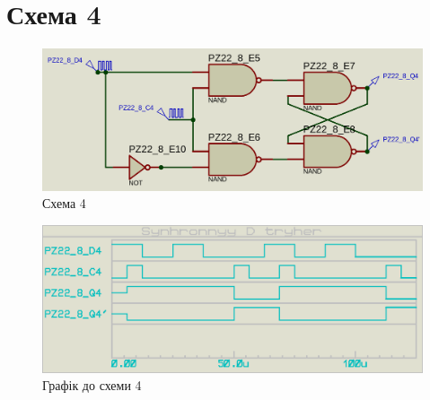 \documentclass{article}
\begin{document}
\begin{normalsize}
\begin{figure}[H]
	\end{figure}

	\section*{Схема 4}	
	\begin{figure}[H]
		\centering
		\includegraphics[scale=0.25]{s4}	
		\caption{Схема 4}
	\end{figure}
	
	\begin{figure}[H]
		\centering
		\includegraphics[scale=0.25]{g4}	
		\caption{Графік до схеми 4}
	\end{figure}


\end{normalsize}
\end{document}
